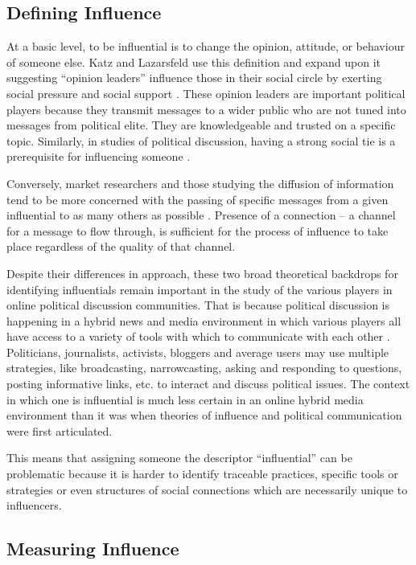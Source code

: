 \documentclass[a4paper,12pt]{article}
\begin{document}
\subsection{Defining Influence}

At a basic level, to be influential is to change the opinion, attitude, or behaviour of someone else. Katz and Lazarsfeld use this definition and expand upon it suggesting ``opinion leaders'' influence those in their social circle by exerting social pressure and social support \cite{katzlazarsfeld}. These opinion leaders are important political players because they transmit messages to a wider public who are not tuned into messages from political elite. They are knowledgeable and trusted on a specific topic. Similarly, in studies of political discussion, having a strong social tie is a prerequisite for influencing someone \cite{Eveland2011}. 

Conversely, market researchers and those studying the diffusion of information tend to be more concerned with the passing of specific messages from a given influential to as many others as possible \cite{Bakshy, Watts2007, Ye2010}. Presence of a connection -- a channel for a message to flow through, is sufficient for the process of influence to take place regardless of the quality of that channel.

Despite their differences in approach, these two broad theoretical backdrops for identifying influentials remain important in the study of the various players in online political discussion communities. That is because political discussion is happening in a hybrid news and media environment in which various players all have access to a variety of tools with which to communicate with each other \cite{Chadwick2011}. Politicians, journalists, activists, bloggers and average users may use multiple strategies, like broadcasting, narrowcasting, asking and responding to questions, posting informative links, etc. to interact and discuss political issues. The context in which one is influential is much less certain in an online hybrid media environment than it was when theories of influence and political communication were first articulated. 

This means that assigning someone the descriptor ``influential'' can be problematic because it is harder to identify traceable practices, specific tools or strategies or even structures of social connections which are necessarily unique to influencers. 

\subsection{Measuring Influence}
\end{document}
